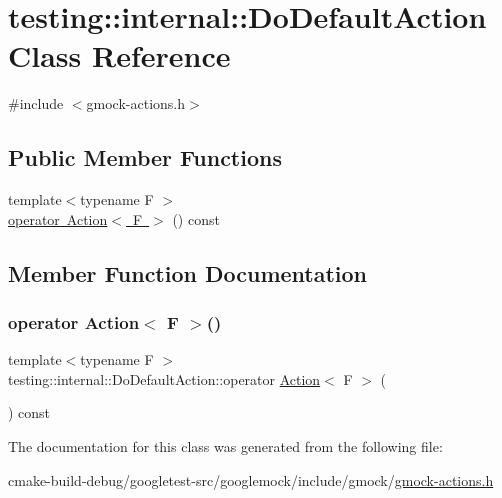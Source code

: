 \hypertarget{classtesting_1_1internal_1_1DoDefaultAction}{}\section{testing\+::internal\+::Do\+Default\+Action Class Reference}
\label{classtesting_1_1internal_1_1DoDefaultAction}


{\ttfamily \#include $<$gmock-\/actions.\+h$>$}

\subsection*{Public Member Functions}
\begin{DoxyCompactItemize}
\item 
{\footnotesize template$<$typename F $>$ }\\\mbox{\hyperlink{classtesting_1_1internal_1_1DoDefaultAction_aea08828a0d64847e29ab7a5abeb74149}{operator Action$<$ F $>$}} () const
\end{DoxyCompactItemize}


\subsection{Member Function Documentation}
\mbox{\label{classtesting_1_1internal_1_1DoDefaultAction_aea08828a0d64847e29ab7a5abeb74149}} 
\subsubsection{\texorpdfstring{operator Action$<$ F $>$()}{operator Action< F >()}}
{\footnotesize\ttfamily template$<$typename F $>$ \\
testing\+::internal\+::\+Do\+Default\+Action\+::operator \mbox{\hyperlink{classtesting_1_1Action}{Action}}$<$ F $>$ (\begin{DoxyParamCaption}{ }\end{DoxyParamCaption}) const\hspace{0.3cm}{\ttfamily [inline]}}



The documentation for this class was generated from the following file\+:\begin{DoxyCompactItemize}
\item 
cmake-\/build-\/debug/googletest-\/src/googlemock/include/gmock/\mbox{\hyperlink{gmock-actions_8h}{gmock-\/actions.\+h}}\end{DoxyCompactItemize}
